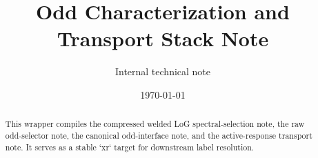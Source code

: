 \documentclass[11pt]{article}
\title{Odd Characterization and Transport Stack Note}
\author{Internal technical note}
\date{\today}
\theoremstyle{definition}
\theoremstyle{plain}
\theoremstyle{remark}
\begin{document}
\maketitle

\begin{abstract}
This wrapper compiles the compressed welded LoG spectral-selection note, the raw odd-selector note,
the canonical odd-interface note, and the active-response transport note.
It serves as a stable `xr` target for downstream label resolution.
\end{abstract}

\tableofcontents

\def\UOMTransportFragmentLoaded{}

\end{document}
